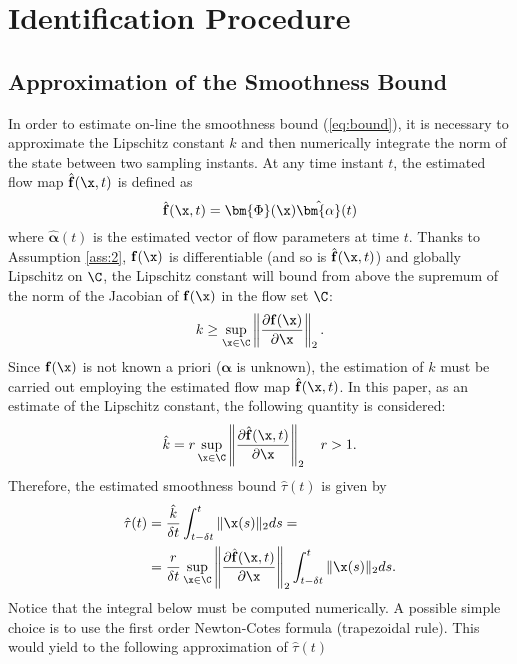 \section{Identification Procedure}\label{Identification}

\subsection{Approximation of the Smoothness Bound}
In order to estimate on-line the smoothness bound (\ref{eq:bound}), it is necessary to approximate the Lipschitz constant $k$ and then numerically integrate the norm of the state between two sampling instants.
At any time instant $t$, the estimated flow map $\hat{\mathbf{f}}(\x,t)$ is defined as
%
\begin{equation}
    \hat{\mathbf{f}}(\x,t)=\bm{\Phi}(\x)\hat{\bm{\alpha}}(t)
\end{equation}
%
where $\hat{\bm{\alpha}}(t)$ is the estimated vector of flow parameters at time $t$. Thanks to Assumption \ref{ass:2}, $\mathbf{f}(\x)$ is differentiable (and so is $\hat{\mathbf{f}}(\x,t)$) and globally Lipschitz on $\C$, the Lipschitz constant will bound from above the supremum of the norm of the Jacobian of $\mathbf{f}(\x)$ in the flow set $\C$:
%
\begin{equation}
    k\geq\sup\limits_{\x\in\C}\left\|\frac{\partial \mathbf{f}(\x)}{\partial\x}\right\|_2.
\end{equation}
%
Since $\mathbf{f}(\x)$ is not known a priori ($\bm{\alpha}$ is unknown), the estimation of $k$ must be carried out employing the estimated flow map $\hat{\mathbf{f}}(\x,t)$. In this paper, as an estimate of the Lipschitz constant, the following quantity is considered:
%
\begin{equation}
    \hat{k} = r\sup\limits_{\x\in\C}\left\|\frac{\partial \hat{\mathbf{f}}(\x,t)}{\partial\x}\right\|_2\quad r>1.
\end{equation}
%
Therefore, the estimated smoothness bound $\hat{\tau}(t)$ is given by
%
\begin{align}
    \hat{\tau}(t) &= \frac{\hat{k}}{\delta t}\int_{t-\delta t}^{t}\|\x(s)\|_2ds =\\
                  &= \frac{r}{\delta t}\sup\limits_{\x\in\C}\left\|\frac{\partial \hat{\mathbf{f}}(\x,t)}{\partial\x}\right\|_2\int_{t-\delta t}^{t}\|\x(s)\|_2ds.
\end{align}
%
Notice that the integral below must be computed numerically. A possible simple choice is to use the first order Newton-Cotes formula (trapezoidal rule). This would yield to the following approximation of $\hat{\tau}(t)$
